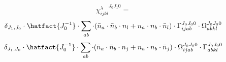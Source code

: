 
\begin{dmath*}
{\chi^{\lambda}_{i j k l}}^{{J}_{0} {J}_{1} 0} = 
\end{dmath*}
\begin{dmath*}
\delta_{{J}_{1},{J}_{0}} \cdot \hatfact{{J}_{0}^{-1}} \cdot \sum_{a b} \cdot (\bar{n}_{a} \cdot \bar{n}_{b} \cdot n_{l} + n_{a} \cdot n_{b} \cdot \bar{n}_{l}) \cdot \Gamma_{i j a b}^{{J}_{0} {J}_{0} 0} \cdot \Omega_{a b k l}^{{J}_{0} {J}_{0} 0}
\end{dmath*}
\begin{dmath*}
\delta_{{J}_{1},{J}_{0}} \cdot \hatfact{{J}_{0}^{-1}} \cdot \sum_{a b} \cdot (\bar{n}_{a} \cdot \bar{n}_{b} \cdot n_{j} + n_{a} \cdot n_{b} \cdot \bar{n}_{j}) \cdot \Omega_{i j a b}^{{J}_{0} {J}_{0} 0} \cdot \Gamma_{a b k l}^{{J}_{0} {J}_{0} 0}
\end{dmath*}

